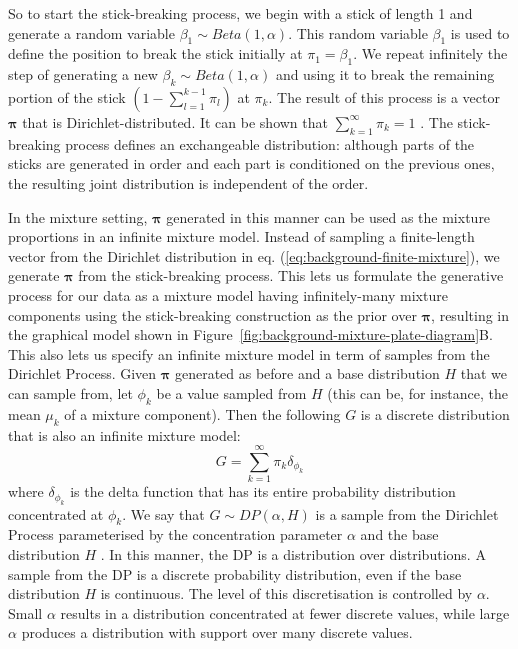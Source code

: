 So to start the stick-breaking process, we begin with a stick of length 1 and generate a random variable $\beta_1 \sim Beta(1, \alpha)$. This random variable $\beta_1$ is used to define the position to break the stick initially at $\pi_1 = \beta_1$. We repeat infinitely the step of generating a new $\beta_k \sim Beta(1, \alpha)$ and using it to break the remaining portion of the stick $(1-\sum_{l=1}^{k-1} \pi_l)$ at $\pi_k$. The result of this process is a vector $\boldsymbol{\pi}$ that is Dirichlet-distributed. It can be shown that $\sum_{k=1}^{\infty} \pi_k=1$ \cite{ishwaran2011gibbs}. The stick-breaking process defines an exchangeable distribution: although parts of the sticks are generated in order and each part is conditioned on the previous ones, the resulting joint distribution is independent of the order.

In the mixture setting, $\boldsymbol{\pi}$ generated in this manner can be used as the mixture proportions in an infinite mixture model. Instead of sampling a finite-length vector from the Dirichlet distribution in eq. (\ref{eq:background-finite-mixture}), we generate $\boldsymbol{\pi}$ from the stick-breaking process. This lets us formulate the generative process for our data as a mixture model having infinitely-many mixture components using the stick-breaking construction as the prior over $\boldsymbol{\pi}$, resulting in the graphical model shown in Figure~\ref{fig:background-mixture-plate-diagram}B. This also lets us specify an infinite mixture model in term of samples from the Dirichlet Process. Given $\boldsymbol{\pi}$ generated as before and a base distribution $H$ that we can sample from, let $\phi_k$ be a value sampled from $H$ (this can be, for instance, the mean $\mu_k$ of a mixture component). Then the following $G$ is a discrete distribution that is also an infinite mixture model:
\begin{equation}
G=\sum_{k=1}^{\infty} \pi_k \delta_{\phi_k}
\end{equation}
where $\delta_{\phi_k}$ is the delta function that has its entire probability distribution concentrated at $\phi_k$. We say that $G \sim DP(\alpha, H)$ is a sample from the Dirichlet Process parameterised by the concentration parameter $\alpha$ and the base distribution $H$ \cite{teh2011dirichlet}. In this manner, the DP is a distribution over distributions. A sample from the DP is a discrete probability distribution, even if the base distribution $H$ is continuous. The level of this discretisation is controlled by $\alpha$. Small $\alpha$ results in a distribution concentrated at fewer discrete values, while large $\alpha$ produces a distribution with support over many discrete values.

